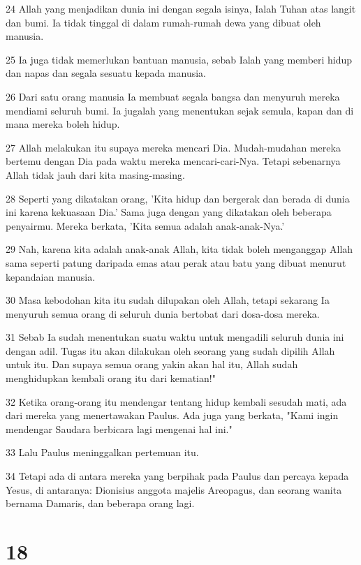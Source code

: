 \par 24 Allah yang menjadikan dunia ini dengan segala isinya, Ialah Tuhan atas langit dan bumi. Ia tidak tinggal di dalam rumah-rumah dewa yang dibuat oleh manusia.
\par 25 Ia juga tidak memerlukan bantuan manusia, sebab Ialah yang memberi hidup dan napas dan segala sesuatu kepada manusia.
\par 26 Dari satu orang manusia Ia membuat segala bangsa dan menyuruh mereka mendiami seluruh bumi. Ia jugalah yang menentukan sejak semula, kapan dan di mana mereka boleh hidup.
\par 27 Allah melakukan itu supaya mereka mencari Dia. Mudah-mudahan mereka bertemu dengan Dia pada waktu mereka mencari-cari-Nya. Tetapi sebenarnya Allah tidak jauh dari kita masing-masing.
\par 28 Seperti yang dikatakan orang, 'Kita hidup dan bergerak dan berada di dunia ini karena kekuasaan Dia.' Sama juga dengan yang dikatakan oleh beberapa penyairmu. Mereka berkata, 'Kita semua adalah anak-anak-Nya.'
\par 29 Nah, karena kita adalah anak-anak Allah, kita tidak boleh menganggap Allah sama seperti patung daripada emas atau perak atau batu yang dibuat menurut kepandaian manusia.
\par 30 Masa kebodohan kita itu sudah dilupakan oleh Allah, tetapi sekarang Ia menyuruh semua orang di seluruh dunia bertobat dari dosa-dosa mereka.
\par 31 Sebab Ia sudah menentukan suatu waktu untuk mengadili seluruh dunia ini dengan adil. Tugas itu akan dilakukan oleh seorang yang sudah dipilih Allah untuk itu. Dan supaya semua orang yakin akan hal itu, Allah sudah menghidupkan kembali orang itu dari kematian!"
\par 32 Ketika orang-orang itu mendengar tentang hidup kembali sesudah mati, ada dari mereka yang menertawakan Paulus. Ada juga yang berkata, "Kami ingin mendengar Saudara berbicara lagi mengenai hal ini."
\par 33 Lalu Paulus meninggalkan pertemuan itu.
\par 34 Tetapi ada di antara mereka yang berpihak pada Paulus dan percaya kepada Yesus, di antaranya: Dionisius anggota majelis Areopagus, dan seorang wanita bernama Damaris, dan beberapa orang lagi.

\chapter{18}

